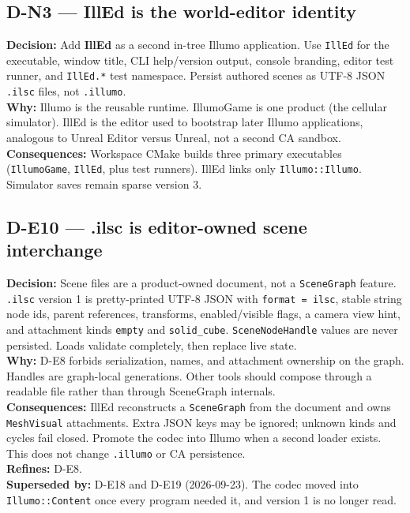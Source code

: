 \subsection*{D-N3 --- IllEd is the world-editor identity}
\begin{decisionbox}[title={D-N3 \quad 2026-08-29}]
\textbf{Decision:} Add \textbf{IllEd} as a second in-tree Illumo application.
Use \texttt{IllEd} for the executable, window title, CLI help/version output,
console branding, editor test runner, and \texttt{IllEd.*} test namespace.
Persist authored scenes as UTF-8 JSON \texttt{.ilsc} files, not
\texttt{.illumo}.\\
\textbf{Why:} Illumo is the reusable runtime. IllumoGame is one product (the
cellular simulator). IllEd is the editor used to bootstrap later Illumo
applications, analogous to Unreal Editor versus Unreal, not a second CA
sandbox.\\
\textbf{Consequences:} Workspace CMake builds three primary executables
(\texttt{IllumoGame}, \texttt{IllEd}, plus test runners). IllEd links only
\texttt{Illumo::Illumo}. Simulator saves remain sparse version 3.
\end{decisionbox}

\subsection*{D-E10 --- .ilsc is editor-owned scene interchange}
\begin{decisionbox}[title={D-E10 \quad 2026-08-29}]
\textbf{Decision:} Scene files are a product-owned document, not a
\texttt{SceneGraph} feature. \texttt{.ilsc} version 1 is pretty-printed UTF-8
JSON with \texttt{format = ilsc}, stable string node ids, parent references,
transforms, enabled/visible flags, a camera view hint, and attachment kinds
\texttt{empty} and \texttt{solid\_cube}. \texttt{SceneNodeHandle} values are
never persisted. Loads validate completely, then replace live state.\\
\textbf{Why:} D-E8 forbids serialization, names, and attachment ownership on
the graph. Handles are graph-local generations. Other tools should compose
through a readable file rather than through SceneGraph internals.\\
\textbf{Consequences:} IllEd reconstructs a \texttt{SceneGraph} from the
document and owns \texttt{MeshVisual} attachments. Extra JSON keys may be
ignored; unknown kinds and cycles fail closed. Promote the codec into Illumo
when a second loader exists. This does not change \texttt{.illumo} or CA
persistence.\\
\textbf{Refines:} D-E8.\\
\textbf{Superseded by:} D-E18 and D-E19 (2026-09-23). The codec moved into
\texttt{Illumo::Content} once every program needed it, and version 1 is no
longer read.
\end{decisionbox}


